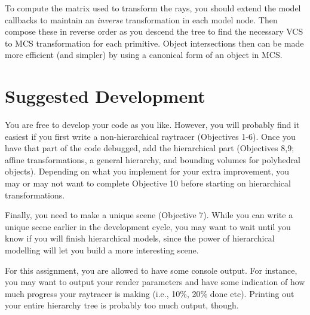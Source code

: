 To compute the matrix used to transform the rays, 
you should extend the model callbacks to
maintain an {\em inverse} transformation in each model node.  
Then compose these in reverse order as you descend the tree to find the
necessary VCS to MCS transformation for each primitive.  
Object intersections then can be
made more efficient (and simpler) by using a canonical form of an
object in MCS.

\section{Suggested Development}
You are free to develop your code as you like.  However, you will
probably find it easiest if you first write a non-hierarchical
raytracer (Objectives 1-6).  Once you have that part of the code
debugged, add the hierarchical part (Objectives 8,9; affine
transformations, a general hierarchy, and bounding volumes for
polyhedral objects).  Depending on
what you implement for your extra improvement, you may or may not want
to complete Objective 10 before starting on hierarchical
transformations.

Finally, you need to make a unique scene (Objective 7).  While you
can write a unique scene earlier in the development cycle, you
may want to wait until you know if you will finish hierarchical
models, since the power of hierarchical modelling will let you
build a more interesting scene.

For this assignment, you are allowed to have some console
output.  For instance, you may want to output your render
parameters and have some indication of how much progress your
raytracer is making (i.e., 10\%, 20\% done etc).  Printing out
your entire hierarchy tree is probably too much output, though.

